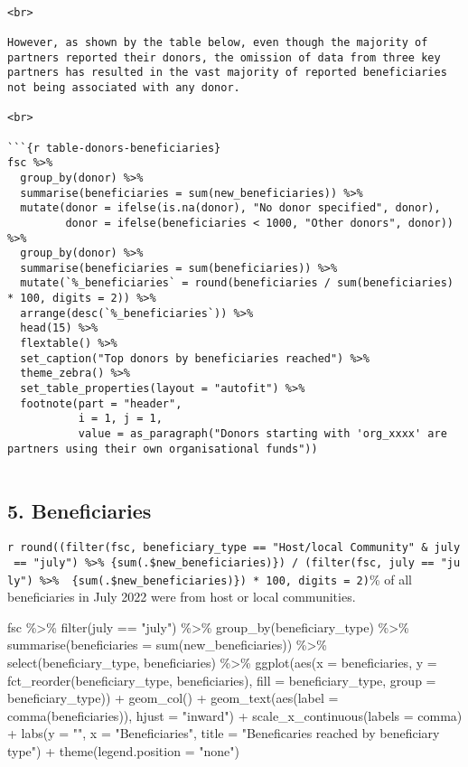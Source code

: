\documentclass[
]{article}
\newenvironment{Shaded}{\begin{snugshade}}{\end{snugshade}}
\newcommand{\NormalTok}[1]{#1}
\begin{document}
\begin{verbatim}

<br>

However, as shown by the table below, even though the majority of partners reported their donors, the omission of data from three key partners has resulted in the vast majority of reported beneficiaries not being associated with any donor.

<br>

```{r table-donors-beneficiaries}
fsc %>% 
  group_by(donor) %>% 
  summarise(beneficiaries = sum(new_beneficiaries)) %>% 
  mutate(donor = ifelse(is.na(donor), "No donor specified", donor), 
         donor = ifelse(beneficiaries < 1000, "Other donors", donor)) %>% 
  group_by(donor) %>% 
  summarise(beneficiaries = sum(beneficiaries)) %>% 
  mutate(`%_beneficiaries` = round(beneficiaries / sum(beneficiaries) * 100, digits = 2)) %>% 
  arrange(desc(`%_beneficiaries`)) %>% 
  head(15) %>% 
  flextable() %>% 
  set_caption("Top donors by beneficiaries reached") %>% 
  theme_zebra() %>% 
  set_table_properties(layout = "autofit") %>% 
  footnote(part = "header", 
           i = 1, j = 1, 
           value = as_paragraph("Donors starting with 'org_xxxx' are partners using their own organisational funds"))
 
\end{verbatim}

\hypertarget{beneficiaries}{%
\subsection{5. Beneficiaries}\label{beneficiaries}}

\texttt{r\ round((filter(fsc,\ beneficiary\_type\ ==\ "Host/local\ Community"\ \&\ july\ ==\ "july")\ \%\textgreater{}\%\ \{sum(.\$new\_beneficiaries)\})\ /\ (filter(fsc,\ july\ ==\ "july")\ \%\textgreater{}\%\ \ \{sum(.\$new\_beneficiaries)\})\ *\ 100,\ digits\ =\ 2)}\%
of all beneficiaries in July 2022 were from host or local communities.

\begin{Shaded}
\begin{Highlighting}[]
\NormalTok{fsc \%\textgreater{}\% }
\NormalTok{  filter(july == "july") \%\textgreater{}\% }
\NormalTok{  group\_by(beneficiary\_type) \%\textgreater{}\% }
\NormalTok{  summarise(beneficiaries = sum(new\_beneficiaries)) \%\textgreater{}\%}
\NormalTok{  select(beneficiary\_type, beneficiaries) \%\textgreater{}\% }
\NormalTok{  ggplot(aes(x = beneficiaries,}
\NormalTok{             y = fct\_reorder(beneficiary\_type, beneficiaries), }
\NormalTok{             fill = beneficiary\_type, }
\NormalTok{             group = beneficiary\_type)) + }
\NormalTok{  geom\_col() + }
\NormalTok{  geom\_text(aes(label = comma(beneficiaries)), }
\NormalTok{            hjust = "inward") + }
\NormalTok{  scale\_x\_continuous(labels = comma) +}
\NormalTok{  labs(y = "", x = "Beneficiaries", }
\NormalTok{       title = "Beneficaries reached by beneficiary type") + }
\NormalTok{  theme(legend.position = "none")}
\end{Highlighting}
\end{Shaded}
\end{document}
